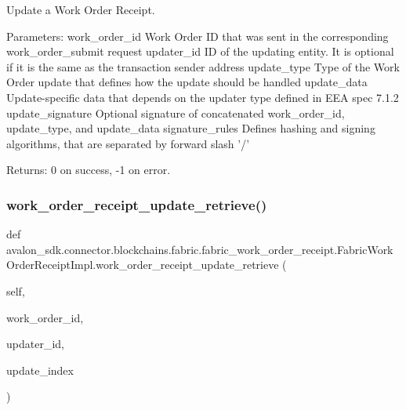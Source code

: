 \begin{DoxyVerb}Update a Work Order Receipt.

Parameters:
work_order_id    Work Order ID that was sent in the
         corresponding work_order_submit request
updater_id       ID of the updating entity. It is optional if it
         is the same as the transaction sender address
update_type      Type of the Work Order update that defines
         how the update should be handled
update_data      Update-specific data that depends on the
         updater type defined in EEA spec 7.1.2
update_signature Optional signature of concatenated
         work_order_id, update_type, and update_data
signature_rules  Defines hashing and signing algorithms,
         that are separated by forward slash '/'

Returns:
0 on success, -1 on error.
\end{DoxyVerb}
 \mbox{\label{classavalon__sdk_1_1connector_1_1blockchains_1_1fabric_1_1fabric__work__order__receipt_1_1FabricWorkOrderReceiptImpl_a288cd2f592b3c3fa4c240620799f5004}} 
\subsubsection{\texorpdfstring{work\+\_\+order\+\_\+receipt\+\_\+update\+\_\+retrieve()}{work\_order\_receipt\_update\_retrieve()}}
{\footnotesize\ttfamily def avalon\+\_\+sdk.\+connector.\+blockchains.\+fabric.\+fabric\+\_\+work\+\_\+order\+\_\+receipt.\+Fabric\+Work\+Order\+Receipt\+Impl.\+work\+\_\+order\+\_\+receipt\+\_\+update\+\_\+retrieve (\begin{DoxyParamCaption}\item[{}]{self,  }\item[{}]{work\+\_\+order\+\_\+id,  }\item[{}]{updater\+\_\+id,  }\item[{}]{update\+\_\+index }\end{DoxyParamCaption})}

